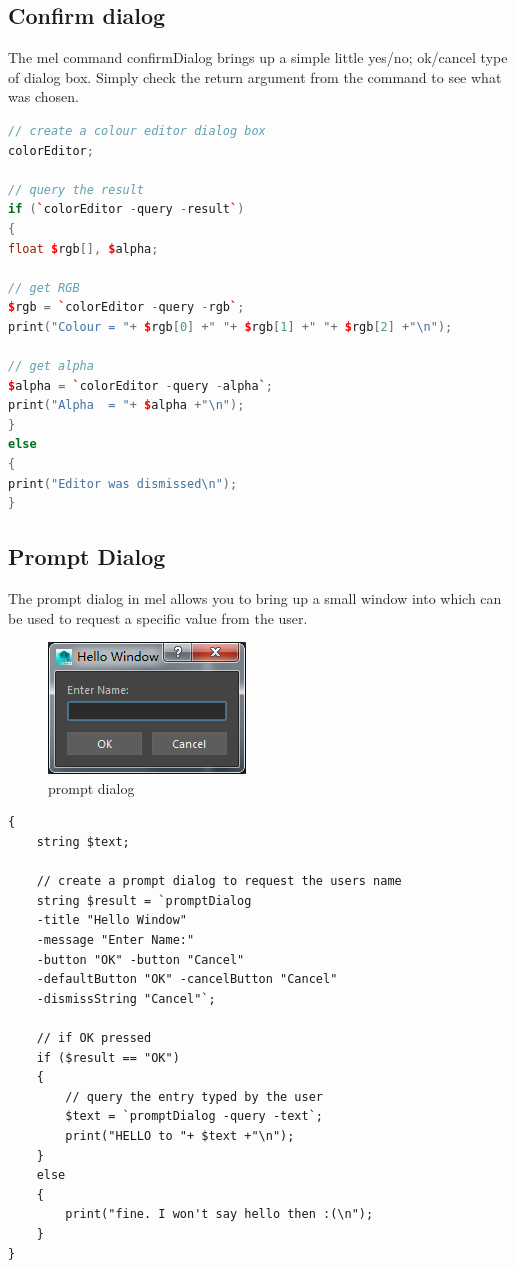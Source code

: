 \subsection{Confirm dialog}

The mel command confirmDialog brings up a simple little yes/no; ok/cancel type of dialog box. Simply check the return argument from the command to see what was chosen.

\begin{lstlisting}[language=C++]
// create a colour editor dialog box
colorEditor;

// query the result
if (`colorEditor -query -result`)
{
float $rgb[], $alpha;

// get RGB
$rgb = `colorEditor -query -rgb`;
print("Colour = "+ $rgb[0] +" "+ $rgb[1] +" "+ $rgb[2] +"\n");

// get alpha
$alpha = `colorEditor -query -alpha`;
print("Alpha  = "+ $alpha +"\n");
}
else
{
print("Editor was dismissed\n");
}

\end{lstlisting}

\subsection{Prompt Dialog}
The prompt dialog in mel allows you to bring up a small window into which can be used to request a specific value from the user.

\begin{figure}[tbh]
	\centering
	\includegraphics[width=0.3\linewidth]{figures/GUI/promptDialog}
	\caption{prompt dialog}
	\label{fig:promptdialog}
\end{figure}


\begin{lstlisting}
{
	string $text;
	
	// create a prompt dialog to request the users name
	string $result = `promptDialog 
	-title "Hello Window"
	-message "Enter Name:"
	-button "OK" -button "Cancel"
	-defaultButton "OK" -cancelButton "Cancel"
	-dismissString "Cancel"`;

	// if OK pressed
	if ($result == "OK")
	{
		// query the entry typed by the user
		$text = `promptDialog -query -text`;
		print("HELLO to "+ $text +"\n");
	}				  
	else
	{
		print("fine. I won't say hello then :(\n");
	}
}
\end{lstlisting}